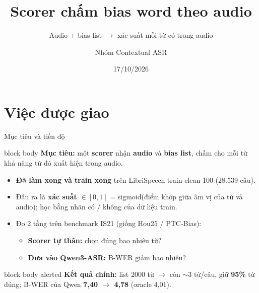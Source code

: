 \documentclass[aspectratio=169,xcolor=table]{beamer}
\title{Scorer chấm bias word theo audio}
\subtitle{Audio + bias list $\rightarrow$ xác suất mỗi từ có trong audio}
\author{Nhóm Contextual ASR}
\institute{}
\date{17/10/2026}
\newcommand{\hi}[1]{\textcolor{Primary}{\textbf{#1}}}
\newcommand{\good}[1]{\textcolor{GoodGreen}{\textbf{#1}}}
\begin{document}
\begin{frame}[plain]\titlepage\end{frame}

\section{Việc được giao}
\begin{frame}{Mục tiêu và tiến độ}
\begin{beamercolorbox}[sep=0.6em,rounded=true]{block body}
\textbf{Mục tiêu:} một \hi{scorer} nhận \textbf{audio} và \textbf{bias list}, chấm cho mỗi từ khả năng từ đó xuất hiện trong audio.
\end{beamercolorbox}
\vspace{0.35cm}
\begin{itemize}\itemsep6pt
\item \good{Đã làm xong và train xong} trên LibriSpeech train-clean-100 (28.539 câu).
\item Đầu ra là \textbf{xác suất} $\in[0,1]$ = sigmoid(điểm khớp giữa âm vị của từ và audio); học bằng nhãn có / không của dữ liệu train.
\item Đo 2 tầng trên benchmark IS21 (giống Hou25 / PTC-Bias):
  \begin{itemize}
  \item \textbf{Scorer tự thân:} chọn đúng bao nhiêu từ?
  \item \textbf{Đưa vào Qwen3-ASR:} B-WER giảm bao nhiêu?
  \end{itemize}
\end{itemize}
\vspace{0.2cm}
\begin{beamercolorbox}[sep=0.5em,rounded=true]{block body alerted}
\small\textbf{Kết quả chính:} list 2000 từ $\rightarrow$ còn $\sim$3 từ/câu, giữ \textbf{95\%} từ đúng; B-WER của Qwen \textbf{7,40 $\rightarrow$ 4,78} (oracle 4,01).
\end{beamercolorbox}
\end{frame}
\end{document}
